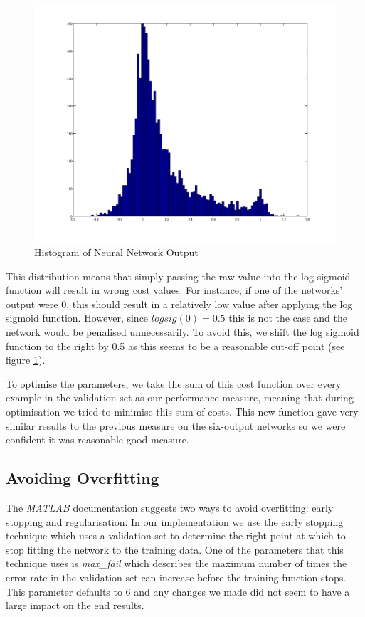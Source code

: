 \documentclass[10pt,a4paper]{article}
\begin{document}
\begin{figure}[!ht]
     \centering
     \includegraphics[scale=0.3]{../../images/clean_hist.png}
     \caption{Histogram of Neural Network Output}
     \label{fig:examplesDistribution}
\end{figure}

This distribution means that simply passing the raw value into the log sigmoid function will result in wrong cost values. For instance, if one of the networks' output were 0, this should result in a relatively low value after applying the log sigmoid function. However, since $logsig(0) = 0.5$ this is not the case and the network would be penalised unnecessarily. To avoid this, we shift the log sigmoid function to the right by 0.5 as this seems to be a reasonable cut-off point (see figure \ref{fig:examplesDistribution}).

To optimise the parameters, we take the sum of this cost function over every example in the validation set as our performance measure, meaning that during optimisation we tried to minimise this sum of costs. This new function gave very similar results to the previous measure on the six-output networks so we were confident it was reasonable good measure.

\subsection{Avoiding Overfitting}
The \emph{MATLAB} documentation suggests two ways to avoid overfitting: early stopping and regularisation. In our implementation we use the early stopping technique which uses a validation set to determine the right point at which to stop fitting the network to the training data. One of the parameters that this technique uses is \emph{max\_fail} which describes the maximum number of times the error rate in the validation set can increase before the training function stops. This parameter defaults to 6 and any changes we made did not seem to have a large impact on the end results.
\end{document}

